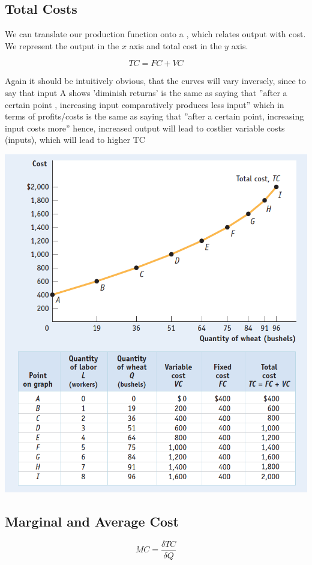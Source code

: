 \documentclass[english,course,draft]{Notes}
\begin{document}
\subsection{Total Costs}

\par{We can translate our production function onto a , which relates output with cost. We represent the output in the $x$ axis and total cost in the $y$ axis.}

$$TC = FC + VC$$

\par{ Again it should be intuitively obvious, that the curves will vary inversely, since to say that input A shows 'diminish returns' is the same as saying that ''after a certain point , increasing input comparatively produces less input'' which in terms of profits/costs is the same as saying that ''after a certain point, increasing input costs more'' hence, increased output will lead to costlier variable costs (inputs), which will lead to higher TC}

\includegraphics[height=0.5\textwidth]{totalCost}

\subsection{Marginal and Average Cost}


$$MC = \frac{\delta TC}{\delta Q}$$


\end{document}

